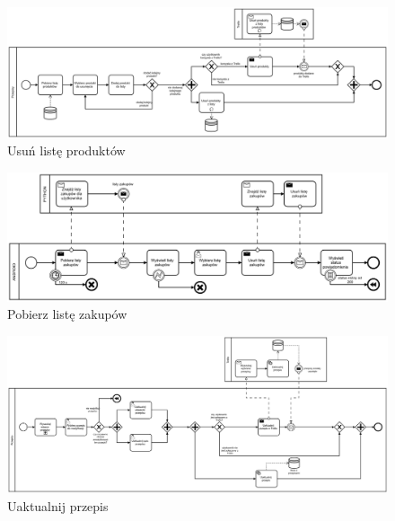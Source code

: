 \documentclass{article}
\begin{document}
\begin{landscape}
\begin{figure}[!ht]
  \centering
    \includegraphics[width=1.5\textwidth]{ok6}\par\vspace{1cm}
  \caption{Usuń listę produktów}
\end{figure}
\end{landscape}

\begin{landscape}
\begin{figure}[!ht]
  \centering
    \includegraphics[width=1.5\textwidth]{g12689}\par\vspace{1cm}
  \caption{Pobierz listę zakupów}
\end{figure}
\end{landscape}

\begin{landscape}
\begin{figure}[!ht]
  \centering
    \includegraphics[width=1.5\textwidth]{g34767}\par\vspace{1cm}
  \caption{Uaktualnij przepis}
\end{figure}
\end{landscape}
\end{document}
